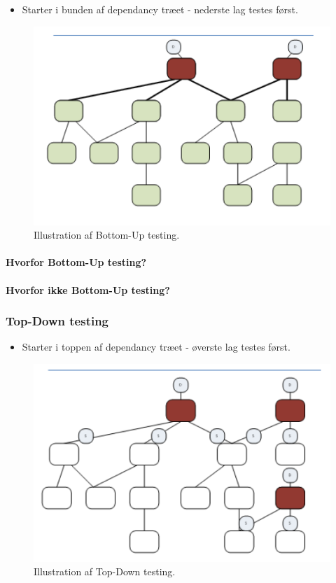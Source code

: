 \begin{itemize}
	\item Starter i bunden af dependancy træet - nederste lag testes først.
\end{itemize}

\begin{figure}
\centering
\includegraphics[width=0.7\linewidth]{figs/bottomUp.PNG}
\caption{Illustration af Bottom-Up testing.}
\label{fig:bottomUp}
\end{figure}

\paragraph{Hvorfor Bottom-Up testing?}

\paragraph{Hvorfor ikke Bottom-Up testing?}


\subsubsection{Top-Down testing}

\begin{itemize}
	\item Starter i toppen af dependancy træet - øverste lag testes først.
\end{itemize}

\begin{figure}
\centering
\includegraphics[width=0.7\linewidth]{figs/topDown.PNG}
\caption{Illustration af Top-Down testing.}
\label{fig:topDown}
\end{figure}

